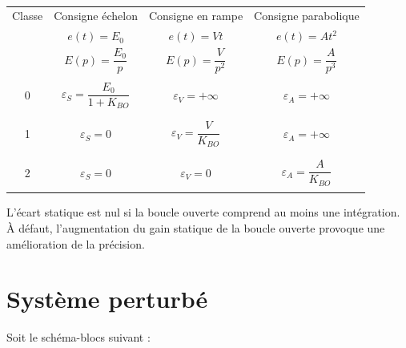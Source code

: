 \documentclass[10pt,fleqn]{article} %
\begin{document}
\begin{resultat} ~\\

\begin{center}
\begin{tabular}{|c|c|c|c|}
\hline 
Classe & Consigne échelon & Consigne en rampe & Consigne parabolique \\
& $e(t)=E_0$ & $e(t)=V t $ & $e(t)=At^2$ \\ 
& $E(p)=\dfrac{E_0}{p}$ & $E(p)=\dfrac{V}{p^2}$ & $E(p)=\dfrac{A}{p^3}$ \\ 
\hline \hline 
&&&\\
0 & $\varepsilon_S = \dfrac{E_0}{1+K_{BO}} $ & $\varepsilon_V = +\infty$ & $\varepsilon_A = +\infty$ \\
&&&\\
\hline 
&&&\\
1 & $\varepsilon_S = 0$ & $\varepsilon_V = \dfrac{V}{K_{BO}} $ & $\varepsilon_A = +\infty$ \\
&&&\\
\hline 
&&&\\
2 & $\varepsilon_S = 0 $ & $\varepsilon_V = 0$ & $\varepsilon_A = \dfrac{A}{K_{BO}}$ \\
&&&\\
\hline 
\end{tabular}
\end{center}

\begin{rem}
L'écart statique est nul si la boucle ouverte comprend au moins une intégration. À défaut, l'augmentation du gain statique de la boucle ouverte provoque une amélioration de la précision.
\end{rem}

\end{resultat}




%

%
%

\section{Système perturbé}
Soit le schéma-blocs suivant : 
\begin{center}

\end{center}
\end{document}
